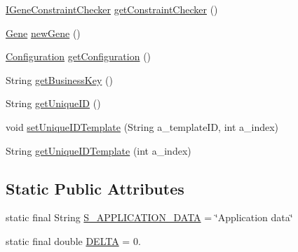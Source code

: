 \begin{DoxyCompactItemize}
\item 
\hyperlink{interfaceorg_1_1jgap_1_1_i_gene_constraint_checker}{I\-Gene\-Constraint\-Checker} \hyperlink{classorg_1_1jgap_1_1_base_gene_ae9823bef7c550fc1533afb8ab2b34d93}{get\-Constraint\-Checker} ()
\item 
\hyperlink{interfaceorg_1_1jgap_1_1_gene}{Gene} \hyperlink{classorg_1_1jgap_1_1_base_gene_a40f8f3d249145ad028892cd706ba9dae}{new\-Gene} ()
\item 
\hyperlink{classorg_1_1jgap_1_1_configuration}{Configuration} \hyperlink{classorg_1_1jgap_1_1_base_gene_a32a316c9cc9e273bd75182cbdf188fb6}{get\-Configuration} ()
\item 
String \hyperlink{classorg_1_1jgap_1_1_base_gene_ac4e7c0fad73465365953b375cfa802a8}{get\-Business\-Key} ()
\item 
String \hyperlink{classorg_1_1jgap_1_1_base_gene_ab53d562a62f5c72fc88c7e5315a23ed7}{get\-Unique\-I\-D} ()
\item 
void \hyperlink{classorg_1_1jgap_1_1_base_gene_aa7d9f1c3c2e727d496d66a85818c17d0}{set\-Unique\-I\-D\-Template} (String a\-\_\-template\-I\-D, int a\-\_\-index)
\item 
String \hyperlink{classorg_1_1jgap_1_1_base_gene_ad3c210e440f2b542391db5a909fda3b7}{get\-Unique\-I\-D\-Template} (int a\-\_\-index)
\end{DoxyCompactItemize}
\subsection*{Static Public Attributes}
\begin{DoxyCompactItemize}
\item 
static final String \hyperlink{classorg_1_1jgap_1_1_base_gene_acc4b1c46f3508b835bf95b9058eae3a0}{S\-\_\-\-A\-P\-P\-L\-I\-C\-A\-T\-I\-O\-N\-\_\-\-D\-A\-T\-A} = \char`\"{}Application data\char`\"{}
\item 
static final double \hyperlink{classorg_1_1jgap_1_1_base_gene_a86edb3d2c29e5064305fabc2dd59a3b9}{D\-E\-L\-T\-A} = 0.
\end{DoxyCompactItemize}
